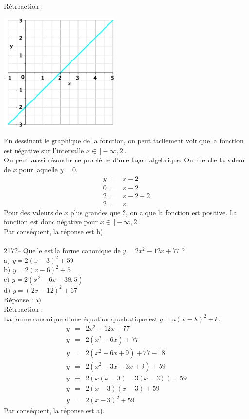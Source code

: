 \documentclass[letterpaper, 12pt]{article}
\begin{document}
R\'etroaction :\\
\begin{center}
 \includegraphics[width=6cm,bb=20 118 575 673]{Q2171.eps}
\end{center}
En dessinant le graphique de la fonction, on peut facilement voir que la fonction est n\'egative sur l'intervalle  $x\in\,]-\infty,2]$.\\
On peut aussi r\'esoudre ce probl\`eme d'une fa\c con alg\'ebrique. On cherche la valeur de $x$ pour laquelle $y=0$.
\begin{eqnarray*}
 y&=&x-2\\
 0&=&x-2\\
 2&=&x-2+2\\
 2&=&x
\end{eqnarray*}
Pour des valeurs de $x$ plus grandes que 2, on a que la fonction est positive. La fonction est donc n\'egative pour $x\in\,]-\infty,2]$.\\
Par cons\'equent, la r\'eponse est b).\\ \\

2172-- Quelle est la forme canonique de $y=2x^{2}-12x+77$ ?\\

a$)$ $y=2(x-3)^{2}+59$\\
b$)$ $y=2(x-6)^{2}+5$\\
c$)$ $y=2(x^{2}-6x+38,5)$\\
d$)$ $y=(2x-12)^{2}+67$\\

R\'eponse : a$)$\\

R\'etroaction :\\
La forme canonique d'une \'equation quadratique est $y=a(x-h)^{2}+k$.
\begin{eqnarray*}
 y&=&2x^{2}-12x+77\\
 y&=&2(x^{2}-6x)+77\\
 y&=&2(x^{2}-6x+9)+77-18\\
 y&=&2(x^{2}-3x-3x+9)+59\\
 y&=&2(x(x-3)-3(x-3))+59\\
 y&=&2(x-3)(x-3)+59\\
 y&=&2(x-3)^{2}+59
\end{eqnarray*}
Par cons\'equent, la r\'eponse est a).\\
\end{document}
